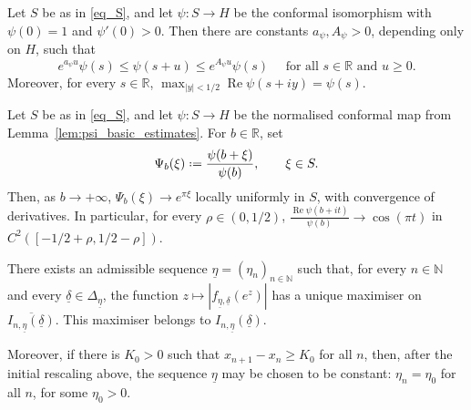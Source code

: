 \documentclass[10pt,a4paper]{amsart}
\newcommand{\N}{{\mathbb{N}}}
\newcommand{\R}{{\mathbb{R}}}
\newcommand{\Rea}{\operatorname{Re }}
\newcommand*{\defeq}{\mathrel{\vcenter{\baselineskip0.5ex \lineskiplimit0pt
 \hbox{\scriptsize.}\hbox{\scriptsize.}}}=}
\newcommand{\uldelta}{\underline{\delta}}
\newcommand{\uleta}{\underline{\eta}}
\begin{document}
\begin{lemma}\label{lem:psi_basic_estimates}
Let \(S\) be as in \eqref{eq_S}, and let \(\psi:S\to H\) be the conformal isomorphism with \(\psi(0)=1\) and \(\psi'(0)>0\). Then there are constants \(a_\psi,A_\psi>0\), depending only on \(H\), such that 
	\begin{equation}\label{eq:lem_aux1}
e^{a_\psi u}\psi(s)\leq\psi(s+u)\leq e^{A_\psi u}\psi(s) \quad \text{ for all } s\in\R \text{ and } u\geq0.
	\end{equation}
Moreover, for every \(s\in\R\), \(\max_{|y|<1/2}\Rea\psi(s+iy)=\psi(s)\).
\end{lemma}

	\begin{corollary}
	\label{cor:psi_large_real}Let \(S\) be as in \eqref{eq_S}, and let \(\psi:S\to H\) be the normalised conformal map from Lemma~\ref{lem:psi_basic_estimates}. For \(b\in\R\), set
	\[
	\Psi_b(\xi)\defeq \frac{\psi(b+\xi)}{\psi(b)},
	\qquad \xi\in S .
	\]
	Then, as \(b\to+\infty\),
	$
	\Psi_b(\xi)\longrightarrow e^{\pi \xi}
	$
	locally uniformly in \(S\), with convergence of derivatives. In particular,
	for every \(\rho\in(0,1/2)\),
	$
	\frac{\Rea \psi(b+it)}{\psi(b)}
	\longrightarrow
	\cos(\pi t)
	$
	in \(C^2([-1/2+\rho,1/2-\rho])\).
\end{corollary}

\begin{lemma}\label{lem:narrow_gate_unique}
	There exists an admissible sequence \(\uleta=(\eta_n)_{n\in\N}\) such that, for every \(n\in\N\) and every \(\uldelta\in\Delta_{\uleta}\), the function \(z\mapsto |f_{\uleta,\uldelta}(e^z)|\) has a unique maximiser on \(\overline{I_{n,\uleta}(\uldelta)}\). This maximiser belongs to \(I_{n,\uleta}(\uldelta)\).
	
	Moreover, if there is \(K_0>0\) such that \(x_{n+1}-x_n\ge K_0\) for all \(n\), then, after the initial rescaling above, the sequence \(\uleta\) may be chosen to be constant: \(\eta_n=\eta_0\) for all \(n\), for some \(\eta_0>0\).
\end{lemma}
\end{document}
